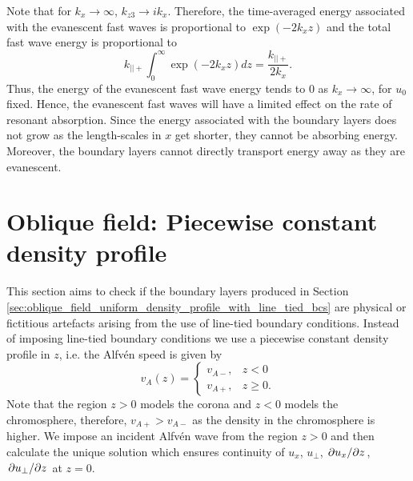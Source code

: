 Note that for $k_x\rightarrow\infty$, $k_{z3}\rightarrow ik_x$. Therefore, the time-averaged energy associated with the evanescent fast waves is proportional to $\exp(-2k_x z)$ and the total fast wave
energy is proportional to
\begin{equation}
    k_{||+}\int_0^\infty \exp(-2 k_x z) dz = \frac{k_{||+}}{2k_x}.
\end{equation}
Thus, the energy of the evanescent fast wave energy tends to 0 as $k_x\rightarrow \infty$, for $u_0$ fixed. Hence, the evanescent fast waves will have a limited effect on the rate of resonant absorption. Since the energy associated with the boundary layers does not grow as the length-scales in $x$ get shorter, they cannot be absorbing energy. Moreover, the boundary layers cannot directly transport energy away as they are evanescent.

\section{Oblique field: Piecewise constant density profile}
\label{sec:oblique_field_piecewise_constant_density_profile}

This section aims to check if the boundary layers produced in Section \ref{sec:oblique_field_uniform_density_profile_with_line_tied_bcs} are physical or fictitious artefacts arising from the use of line-tied boundary conditions. Instead of imposing line-tied boundary conditions we use a piecewise constant density profile in $z$, i.e. the Alfv\'en speed is given by
\begin{equation}
    v_A(z) = \begin{cases}
    v_{A-}, & z < 0 \\
    v_{A+}, & z \ge 0.
    \end{cases}
\end{equation}
Note that the region $z>0$ models the corona and $z<0$ models the chromosphere, therefore, $v_{A+} > v_{A-}$ as the density in the chromosphere is higher. We impose an incident Alfv\'en wave from the region $z>0$ and then calculate the unique solution which ensures continuity of $u_x$, $u_\perp$, $\pdv*{u_x}{z}$, $\pdv*{u_\perp}{z}$ at $z=0$.

